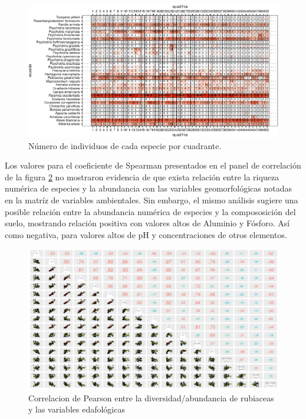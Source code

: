 \documentclass[11pt,]{article}
\begin{document}
\begin{figure}
\centering
\includegraphics{manuscrito_files/figure-latex/unnamed-chunk-3-1.pdf}
\caption{\label{fig:abun_sp_q}Número de individuos de cada especie por
cuadrante.}
\end{figure}

Los valores para el coeficiente de Spearman presentados en el panel de
correlación de la figura \ref{fig:panel_cor_suelo_abun_riq_rubic} no
mostraron evidencia de que exista relación entre la riqueza numérica de
especies y la abundancia con las variables geomorfológicas notadas en la
matríz de variables ambientales. Sin embargo, el mismo análisis sugiere
una posible relación entre la abundancia numérica de especies y la
compososición del suelo, mostrando relación positiva con valores altos
de Aluminio y Fósforo. Así como negativa, para valores altos de pH y
concentraciones de otros elementos.

\begin{figure}
\centering
\includegraphics{panel_cor_suelo_abun_riq_rubic_spear.png}
\caption{Correlacion de Pearson entre la diversidad/abundancia de
rubiaceas y las variables edafológicas
\label{fig:panel_cor_suelo_abun_riq_rubic}}
\end{figure}
\end{document}
